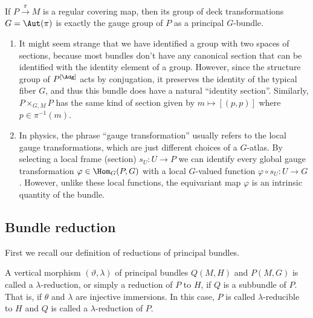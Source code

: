 \begin{example}
    If $P\overset{\pi}{\to} M$ is a regular covering map, then its group of deck transformations $G=\Aut(\pi)$ is exactly the gauge group of $P$ as a principal $G$-bundle.
\end{example}


\begin{rem}
    \begin{enumerate}
        \item It might seem strange that we have identified a group with two spaces of sections, because most bundles don't have any canonical section that can be identified with the identity element of a group. However, since the structure group of $P^{[\Adg]}$ acts by conjugation, it preserves the identity of the typical fiber $G$, and thus this bundle does have a natural ``identity section''. Similarly, $P\times_{G,M}P$ has the same kind of section given by $m\mapsto [(p,p)]$ where $p\in \pi^{-1}(m)$.
        \item In physics, the phrase ``gauge transformation'' usually refers to the local gauge transformations, which are just different choices of a $G$-atlas. By selecting a local frame (section) $s_U:U\to P$ we can identify every global gauge transformation $\varphi\in \Hom_G(P,G)$ with a local $G$-valued  function $\varphi\circ s_U:U\to G$. However, unlike these local functions, the equivariant map $\varphi$ is an intrinsic quantity of the bundle.
    \end{enumerate}
\end{rem}





\subsection{Bundle reduction}\label{sec: bundle reduction}

First we recall our definition of reductions of principal bundles.

\begin{defn}
    A vertical morphism $(\vartheta,\lambda)$ of principal bundles $Q(M,H)$ and $P(M,G)$ is called a $\lambda$-reduction, or simply a reduction of $P$ to $H$, if $Q$ is a subbundle of $P$. That is, if $\theta$ and $\lambda$ are injective immersions. In this case, $P$ is called $\lambda$-reducible to $H$ and $Q$ is called a $\lambda$-reduction of $P$.
\end{defn}

